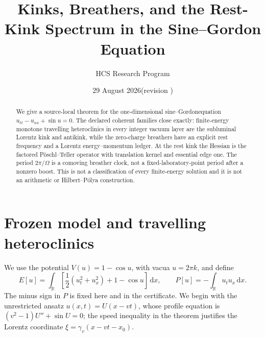 \documentclass[10pt]{article}
\title{Kinks, Breathers, and the Rest-Kink Spectrum in the Sine--Gordon Equation}
\author{HCS Research Program}
\date{29 August 2026\quad (revision \CRevisionRound)}
\newcommand{\R}{\mathbb R}
\newcommand{\dd}{\,\mathrm d}
\newcommand{\sg}{sine--Gordon}
\begin{document}
\maketitle
\begin{abstract}
We give a source-local theorem for the one-dimensional \sg equation
$u_{tt}-u_{xx}+\sin u=0$.  The declared coherent families close exactly:
finite-energy monotone travelling heteroclinics in every integer vacuum layer
are the subluminal Lorentz kink and antikink, while the zero-charge breathers have an explicit rest
frequency and a Lorentz energy--momentum ledger.  At the rest kink the Hessian
is the factored Pöschl--Teller operator with translation kernel and essential
edge one.  The period $2\pi/\Omega$ is a comoving breather clock, not a
fixed-laboratory-point period after a nonzero boost.  This is not a
classification of every finite-energy solution and it is not an arithmetic or
Hilbert--Pólya construction.
\end{abstract}

\section{Frozen model and travelling heteroclinics}
We use the potential $V(u)=1-\cos u$, with vacua $u=2\pi k$, and define
\begin{equation}
 E[u]=\int_{\R}\left[\frac12(u_t^2+u_x^2)+1-\cos u\right]\dd x,
 \qquad P[u]=-\int_{\R}u_tu_x\dd x .
 \label{eq:ledger}
\end{equation}
The minus sign in $P$ is fixed here and in the certificate.  We begin with
the unrestricted ansatz $u(x,t)=U(x-vt)$, whose profile equation is
$(v^2-1)U''+\sin U=0$; the speed inequality in the theorem justifies the
Lorentz coordinate $\xi=\gamma_v(x-vt-x_0)$.
\end{document}

